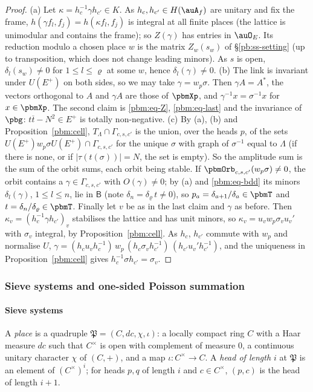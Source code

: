 \documentclass[10pt]{amsart}
\theoremstyle{definition}
\theoremstyle{remark}
\providecommand{\aubar}[1]{\overline{#1}}
\begin{document}
\begin{proof}
(a) Let $\kappa=h_c^{-1}\gamma h_{c'}\in K$. As $h_c,h_{c'}\in H(\auA_f)$ are unitary and fix the
frame, $h(\gamma f_l,f_j)=h(\kappa f_l,f_j)$ is integral at all finite places (the lattice is
unimodular and contains the frame); so $Z(\gamma)$ has entries in $\auO_E$. Its reduction modulo a
chosen place $w$ is the matrix $Z_w(s_w)$ of \S\ref{pb:ss-setting} (up to transposition, which does
not change leading minors). As $s$ is open, $\delta_l(s_w)\ne0$ for $1\le l\le\varrho$ at some $w$,
hence $\delta_l(\gamma)\ne0$. (b) The link is invariant under $U(E^+)$ on both sides, so we may take
$\gamma=w_p\sigma$. Then $\gamma A=A^*$, the vectors orthogonal to $A$ and $\gamma A$ are those of
$\pbmXp$, and $\gamma^{-1}x=\sigma^{-1}x$ for $x\in\pbmXp$. The second claim is \eqref{pbm:eq-Z},
\eqref{pbm:eq-last} and the invariance of $\pbg$: $t\aubar t-N^2\in E^+$ is totally non-negative.
(c) By (a), (b) and Proposition~\ref{pbm:cell}, $T_\Lambda\cap\Gamma_{c,s,c'}$ is the union, over
the heads $p$, of the sets $U(E^+)w_p\sigma U(E^+)\cap\Gamma_{c,s,c'}$ for the unique $\sigma$ with
graph of $\sigma^{-1}$ equal to $\Lambda$ (if there is none, or if $|\tau(t(\sigma))|=N$, the set is
empty). So the amplitude sum is the sum of the orbit sums, each orbit being stable. If
$\pbmOrb_{c,s,c'}(w_p\sigma)\ne0$, the orbit contains a $\gamma\in\Gamma_{c,s,c'}$ with $O(\gamma)\ne
0$; by (a) and \eqref{pbm:eq-bdd} its minors $\delta_l(\gamma)$, $1\le l\le n$, lie in $\mathsf B$
(note $\delta_n=\delta_\varrho\,t\ne0$), so $p_a=\delta_{a+1}/\delta_a\in\pbmT$ and $t=\delta_n/
\delta_\varrho\in\pbmT$. Finally let $v$ be as in the last claim and $\gamma$ as before. Then
$\kappa_v=(h_c^{-1}\gamma h_{c'})_v$ stabilises the lattice and has unit minors, so $\kappa_v=u_v
w_p\sigma_vu_v'$ with $\sigma_v$ integral, by Proposition~\ref{pbm:cell}. As $h_c$, $h_{c'}$ commute
with $w_p$ and normalise $U$, $\gamma=(h_cu_vh_c^{-1})\,w_p\,(h_c\sigma_vh_{c'}^{-1})\,(h_{c'}u_v'h_{c'}^{
-1})$, and the uniqueness in Proposition~\ref{pbm:cell} gives $h_c^{-1}\sigma h_{c'}=\sigma_v$.
\end{proof}

\subsubsection{Sieve systems and one-sided Poisson summation}\label{pbm:ss-sieve}

\paragraph*{Sieve systems}
A \emph{place} is a quadruple $\mathfrak P=(C,dc,\chi,\iota)$: a locally compact ring $C$ with a
Haar measure $dc$ such that $C^\times$ is open with complement of measure $0$, a continuous unitary
character $\chi$ of $(C,+)$, and a map $\iota\colon C^\times\to C$. A \emph{head of length $i$} at
$\mathfrak P$ is an element of $(C^\times)^i$; for heads $p,q$ of length $i$ and $c\in C^\times$,
$(p,c)$ is the head of length $i+1$.
\end{document}
